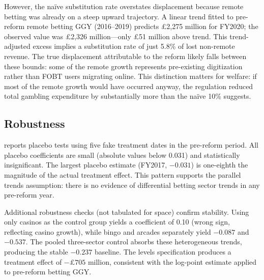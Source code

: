 \documentclass[12pt]{article}
\begin{document}
However, the na\"ive substitution rate overstates displacement because remote betting was already on a steep upward trajectory. A linear trend fitted to pre-reform remote betting GGY (2016--2019) predicts \pounds 2,275 million for FY2020; the observed value was \pounds 2,326 million---only \pounds 51 million above trend. This trend-adjusted excess implies a substitution rate of just 5.8\% of lost non-remote revenue. The true displacement attributable to the reform likely falls between these bounds: some of the remote growth represents pre-existing digitization rather than FOBT users migrating online. This distinction matters for welfare: if most of the remote growth would have occurred anyway, the regulation reduced total gambling expenditure by substantially more than the na\"ive 10\% suggests.

\subsection{Robustness}



 reports placebo tests using five fake treatment dates in the pre-reform period. All placebo coefficients are small (absolute values below 0.031) and statistically insignificant. The largest placebo estimate (FY2017, $-0.031$) is one-eighth the magnitude of the actual treatment effect. This pattern supports the parallel trends assumption: there is no evidence of differential betting sector trends in any pre-reform year.

Additional robustness checks (not tabulated for space) confirm stability. Using only casinos as the control group yields a coefficient of 0.10 (wrong sign, reflecting casino growth), while bingo and arcades separately yield $-0.087$ and $-0.537$. The pooled three-sector control absorbs these heterogeneous trends, producing the stable $-0.237$ baseline. The levels specification produces a treatment effect of $-\pounds 705$ million, consistent with the log-point estimate applied to pre-reform betting GGY.
\end{document}
